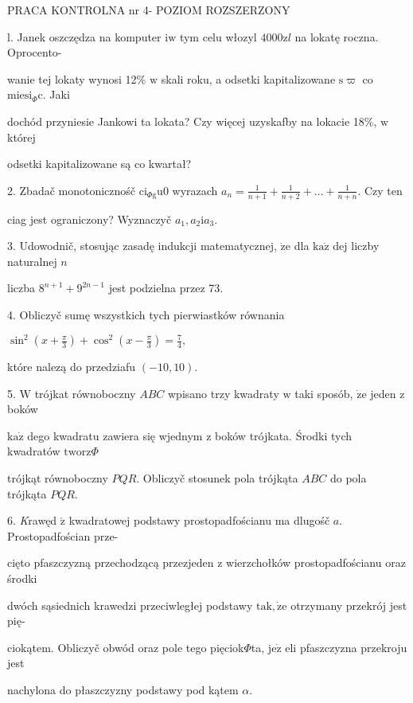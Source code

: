 \documentclass[a4paper,12pt]{article}
\begin{document}
PRACA KONTROLNA nr 4- POZIOM ROZSZERZONY

l. Janek oszczędza na komputer $\mathrm{i}\mathrm{w}$ tym celu włozyl $4000\mathrm{z}l$ na lokatę roczna. Oprocento-

wanie tej lokaty wynosi 12\% $\mathrm{w}$ skali roku, a odsetki kapitalizowane $\mathrm{s}\varpi$ co $\mathrm{m}\mathrm{i}\mathrm{e}\mathrm{s}\mathrm{i}_{\Phi}\mathrm{c}$. Jaki

dochód przyniesie Jankowi ta lokata? Czy więcej uzyskafby na lokacie 18\%, $\mathrm{w}$ której

odsetki kapitalizowane są co kwartał?

2. Zbadač monotonicznośč $\mathrm{c}\mathrm{i}_{\Phi \mathrm{g}}\mathrm{u}0$ wyrazach $a_{n}=\displaystyle \frac{1}{n+1}+\frac{1}{n+2}+\ldots+\frac{1}{n+n}$. Czy ten

ciag jest ograniczony? Wyznaczyč $a_{1}, a_{2}\mathrm{i}a_{3}.$

3. Udowodnič, stosując zasadę indukcji matematycznej, $\dot{\mathrm{z}}\mathrm{e}$ dla $\mathrm{k}\mathrm{a}\dot{\mathrm{z}}$ dej liczby naturalnej $n$

liczba $8^{n+1}+9^{2n-1}$ jest podzielna przez 73.

4. Obliczyč sumę wszystkich tych pierwiastków równania

$\displaystyle \sin^{2}(x+\frac{\pi}{3})+\cos^{2}(x-\frac{\pi}{3})=\frac{7}{4},$

które nalezą do przedziafu $(-10,10).$

5. $\mathrm{W}$ trójkat równoboczny $ABC$ wpisano trzy kwadraty $\mathrm{w}$ taki sposób, $\dot{\mathrm{z}}\mathrm{e}$ jeden $\mathrm{z}$ boków

$\mathrm{k}\mathrm{a}\dot{\mathrm{z}}$ dego kwadratu zawiera się wjednym $\mathrm{z}$ boków trójkata. Środki tych kwadratów $\mathrm{t}\mathrm{w}\mathrm{o}\mathrm{r}\mathrm{z}\Phi$

trójkąt równoboczny $PQR$. Obliczyč stosunek pola trójkąta $ABC$ do pola trójkąta $PQR.$

6. {\it K}rawęd $\acute{\mathrm{z}}$ kwadratowej podstawy prostopadfościanu ma dlugośč $a$. Prostopadfościan prze-

cięto pfaszczyzną przechodzącą przezjeden $\mathrm{z}$ wierzchołków prostopadfościanu oraz środki

dwóch sąsiednich krawedzi przeciwległej podstawy $\mathrm{t}\mathrm{a}\mathrm{k}, \dot{\mathrm{z}}\mathrm{e}$ otrzymany przekrój jest pię-

ciokątem. Obliczyč obwód oraz pole tego pięciok$\Phi$ta, $\mathrm{j}\mathrm{e}\dot{\mathrm{z}}$ eli pfaszczyzna przekroju jest

nachylona do płaszczyzny podstawy pod kątem $\alpha.$
\end{document}
